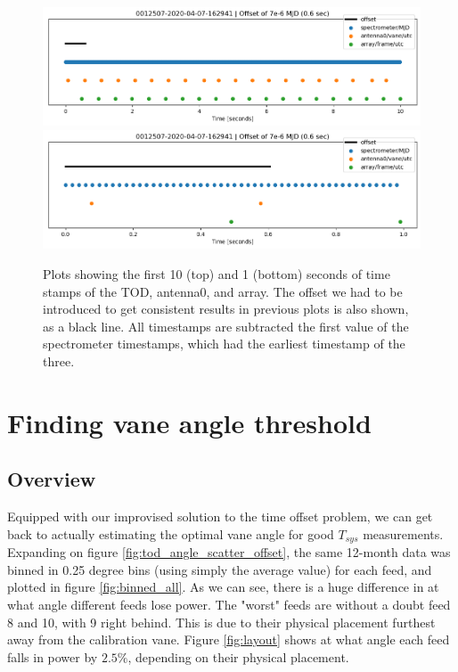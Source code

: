 \documentclass[10pt, a4paper]{article}
\begin{document}
\begin{figure}[H]
    \centering
    \includegraphics[scale=0.5]{../plots/times_20.png}
    \includegraphics[scale=0.5]{../plots/times_2.png}
    \caption{Plots showing the first 10 (top) and 1 (bottom) seconds of time stamps of the TOD, antenna0, and array. The offset we had to be introduced to get consistent results in previous plots is also shown, as a black line. All timestamps are subtracted the first value of the spectrometer timestamps, which had the earliest timestamp of the three.}
    \label{fig:time}
\end{figure}




\section{Finding vane angle threshold}
\subsection{Overview}
Equipped with our improvised solution to the time offset problem, we can get back to actually estimating the optimal vane angle for good $T_{sys}$ measurements. Expanding on figure \ref{fig:tod_angle_scatter_offset}, the same 12-month data was binned in 0.25 degree bins (using simply the average value) for each feed, and plotted in figure \ref{fig:binned_all}. As we can see, there is a huge difference in at what angle different feeds lose power. The "worst" feeds are without a doubt feed 8 and 10, with 9 right behind. This is due to their physical placement furthest away from the calibration vane. Figure \ref{fig:layout} shows at what angle each feed falls in power by $2.5\%$, depending on their physical placement. 
\end{document}
